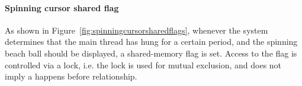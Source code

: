 \paragraph{Spinning cursor shared flag}
As shown in Figure~\ref{fig:spinningcursorsharedflags},
whenever the system determines that the main thread has hung for a certain
period, and the spinning beach ball should be displayed, a shared-memory flag
is set. Access to the flag is controlled via a lock, i.e. the lock is used for
mutual exclusion, and does not imply a happens before relationship.

